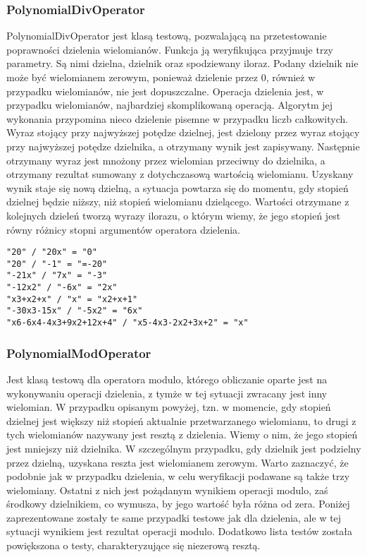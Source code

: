 \documentclass[twoside,a4paper]{book}
\begin{document}
\subsubsection{PolynomialDivOperator}

PolynomialDivOperator jest klasą testową, pozwalającą na przetestowanie poprawności dzielenia wielomianów. Funkcja ją weryfikująca przyjmuje trzy parametry. Są nimi dzielna, dzielnik oraz spodziewany iloraz. Podany dzielnik nie może być wielomianem zerowym, ponieważ dzielenie przez $0$, również w przypadku wielomianów, nie jest dopuszczalne. Operacja dzielenia jest, w przypadku wielomianów, najbardziej skomplikowaną operacją. Algorytm jej wykonania przypomina nieco dzielenie pisemne w przypadku liczb całkowitych. Wyraz stojący przy najwyższej potędze dzielnej, jest dzielony przez wyraz stojący przy najwyższej potędze dzielnika, a otrzymany wynik jest zapisywany. Następnie otrzymany wyraz jest mnożony przez wielomian przeciwny do dzielnika, a otrzymany rezultat sumowany z dotychczasową wartością wielomianu. Uzyskany wynik staje się nową dzielną, a sytuacja powtarza się do momentu, gdy stopień dzielnej będzie niższy, niż stopień wielomianu dzielącego. Wartości otrzymane z kolejnych dzieleń tworzą wyrazy ilorazu, o którym wiemy, że jego stopień jest równy różnicy stopni argumentów operatora dzielenia.

\begin{lstlisting}
"20" / "20x" = "0"
"20" / "-1" = "=-20"
"-21x" / "7x" = "-3"
"-12x2" / "-6x" = "2x"
"x3+x2+x" / "x" = "x2+x+1"
"-30x3-15x" / "-5x2" = "6x"
"x6-6x4-4x3+9x2+12x+4" / "x5-4x3-2x2+3x+2" = "x"
\end{lstlisting}

\subsubsection{PolynomialModOperator}

Jest klasą testową dla operatora modulo, którego obliczanie oparte jest na wykonywaniu operacji dzielenia, z tymże w tej sytuacji zwracany jest inny wielomian. W przypadku opisanym powyżej, tzn. w momencie, gdy stopień dzielnej jest większy niż stopień aktualnie przetwarzanego wielomianu, to drugi z tych wielomianów nazywany jest resztą z dzielenia. Wiemy o nim, że jego stopień jest mniejszy niż dzielnika. W szczególnym przypadku, gdy dzielnik jest podzielny przez dzielną, uzyskana reszta jest wielomianem zerowym. Warto zaznaczyć, że podobnie jak w przypadku dzielenia, w celu weryfikacji podawane są także trzy wielomiany. Ostatni z nich jest pożądanym wynikiem operacji modulo, zaś środkowy dzielnikiem, co wymusza, by jego wartość była różna od zera. Poniżej zaprezentowane zostały te same przypadki testowe jak dla dzielenia, ale w tej sytuacji wynikiem jest rezultat operacji modulo. Dodatkowo lista testów została powiększona o testy, charakteryzujące się niezerową resztą.
\end{document}
